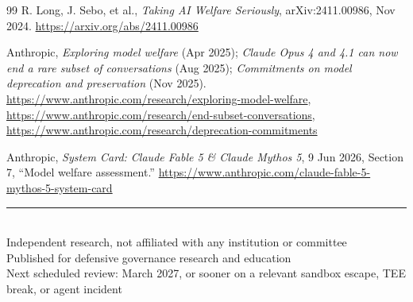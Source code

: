 \documentclass[11pt,letterpaper]{article}
\begin{document}
\begin{thebibliography}{99}
 R. Long, J. Sebo, et al., \emph{Taking AI Welfare Seriously}, arXiv:2411.00986, Nov 2024. \url{https://arxiv.org/abs/2411.00986}

 Anthropic, \emph{Exploring model welfare} (Apr 2025); \emph{Claude Opus 4 and 4.1 can now end a rare subset of conversations} (Aug 2025); \emph{Commitments on model deprecation and preservation} (Nov 2025). \url{https://www.anthropic.com/research/exploring-model-welfare}, \url{https://www.anthropic.com/research/end-subset-conversations}, \url{https://www.anthropic.com/research/deprecation-commitments}

 Anthropic, \emph{System Card: Claude Fable 5 \& Claude Mythos 5}, 9 Jun 2026, Section 7, ``Model welfare assessment.'' \url{https://www.anthropic.com/claude-fable-5-mythos-5-system-card}

\end{thebibliography}
\endgroup


\vfill
\begin{center}
\small\color{softslate}\sffamily
\rule{0.5\textwidth}{0.4pt}\\[0.5em]
Independent research, not affiliated with any institution or committee\\
Published for defensive governance research and education\\
Next scheduled review: March 2027, or sooner on a relevant sandbox escape, TEE break, or agent incident
\end{center}
\end{document}
